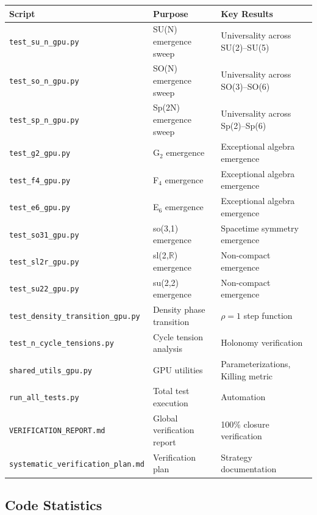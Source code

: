 \begin{center}
\small
{}
\label{tab:verification_scripts}
\begin{tabular}{lll}
\hline\hline
Script & Purpose & Key Results \\
\hline
\texttt{test\_su\_n\_gpu.py} & SU(N) emergence sweep & Universality across SU(2)--SU(5) \\
\texttt{test\_so\_n\_gpu.py} & SO(N) emergence sweep & Universality across SO(3)--SO(6) \\
\texttt{test\_sp\_n\_gpu.py} & Sp(2N) emergence sweep & Universality across Sp(2)--Sp(6) \\
\texttt{test\_g2\_gpu.py} & G$_2$ emergence & Exceptional algebra emergence \\
\texttt{test\_f4\_gpu.py} & F$_4$ emergence & Exceptional algebra emergence \\
\texttt{test\_e6\_gpu.py} & E$_6$ emergence & Exceptional algebra emergence \\
\texttt{test\_so31\_gpu.py} & so(3,1) emergence & Spacetime symmetry emergence \\
\texttt{test\_sl2r\_gpu.py} & sl(2,$\mathbb{R}$) emergence & Non-compact emergence \\
\texttt{test\_su22\_gpu.py} & su(2,2) emergence & Non-compact emergence \\
\texttt{test\_density\_transition\_gpu.py} & Density phase transition & $\rho = 1$ step function \\
\texttt{test\_n\_cycle\_tensions.py} & Cycle tension analysis & Holonomy verification \\
\texttt{shared\_utils\_gpu.py} & GPU utilities & Parameterizations, Killing metric \\
\texttt{run\_all\_tests.py} & Total test execution & Automation \\
\texttt{VERIFICATION\_REPORT.md} & Global verification report & 100\% closure verification \\
\texttt{systematic\_verification\_plan.md} & Verification plan & Strategy documentation \\
\hline\hline
\end{tabular}
\end{center}

\subsection{Code Statistics}\label{app:code_stats}

